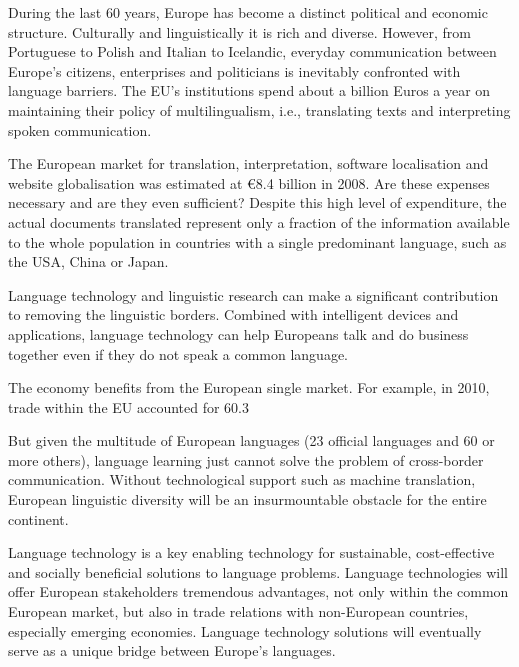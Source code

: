 \begin{multicols}{2}
During the last 60 years, Europe has become a distinct political and economic structure. Culturally and linguistically it is rich and diverse. However, from Portuguese to Polish and Italian to Icelandic, everyday communication between Europe's citizens, enterprises and politicians is inevitably confronted with language barriers. The EU's institutions spend about a billion Euros a year on maintaining their policy of multilingualism, i.e., translating texts and interpreting spoken communication.

The European market for translation, interpretation, software localisation and website globalisation was estimated at €8.4 billion in 2008. Are these expenses necessary and are they even sufficient? Despite this high level of expenditure, the actual documents translated represent only a fraction of the information available to the whole population in countries with a single predominant language, such as the USA, China or Japan.

Language technology and linguistic research can make a significant contribution to removing the linguistic borders. Combined with intelligent devices and applications, language technology can help Europeans talk and do business together even if they do not speak a common language.

The economy benefits from the European single market. For example, in 2010, trade within the EU accounted for 60.3%

But given the multitude of European languages (23 official languages and 60 or more others), language learning just cannot solve the problem of cross-border communication. Without technological support such as machine translation, European linguistic diversity will be an insurmountable obstacle for the entire continent.

Language technology is a key enabling technology for sustainable, cost-effective and socially beneficial solutions to language problems. Language technologies will offer European stakeholders tremendous advantages, not only within the common European market, but also in trade relations with non-European countries, especially emerging economies. Language technology solutions will eventually serve as a unique bridge between Europe's languages.


\end{multicols}
